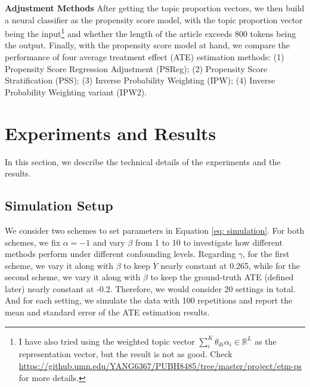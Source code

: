 \documentclass{article}
\begin{document}
	\textbf{Adjustment Methods} After getting the topic proportion vectors, we then build a neural classifier as the propensity score model, with the topic proportion vector being the input\footnote{I have also tried using the weighted topic vector $\sum_i^K \theta_{di} \alpha_i \in \mathbb{R}^L$ as the representation vector, but the result is not as good. Check \url{https://github.umn.edu/YANG6367/PUBH8485/tree/master/project/etm-ps} for more details.} and whether the length of the article exceeds 800 tokens being the output. Finally, with the propensity score model at hand, we compare the performance of four average treatment effect (ATE) estimation methods: (1) Propensity Score Regression Adjustment (PSReg); (2) Propensity Score Stratification (PSS); (3) Inverse Probability Weighting (IPW); (4) Inverse Probability Weighting variant (IPW2).
	
	
	\section{Experiments and Results}\label{section: results}
	In this section, we describe the technical details of the experiments and the results. 
	
	\subsection{Simulation Setup}
		
	We consider two schemes to set parameters in Equation \ref{eq: simulation}. For both schemes, we fix $\alpha = -1$ and vary $\beta$ from 1 to 10 to investigate how different methods perform under different confounding levels. Regarding $\gamma$, for the first scheme, we vary it along with $\beta$ to keep $\overline{Y}$  nearly constant at 0.265, while for the second scheme, we vary it along with $\beta$ to keep the ground-truth ATE (defined later) nearly constant at -0.2. Therefore, we would consider 20 settings in total. And for each setting, we simulate the data with 100 repetitions and report the mean and standard error of the ATE estimation results. 
	
\end{document}
